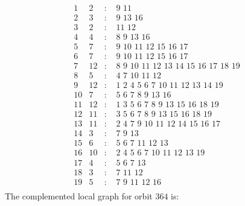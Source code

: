 \documentclass[12pt]{article}
\begin{document}
\begin{equation*}
\begin{array}{rrcl}
1&2&:&\,\,9\,\,11\\
2&3&:&\,\,9\,\,13\,\,16\\
3&2&:&\,\,11\,\,12\\
4&4&:&\,\,8\,\,9\,\,13\,\,16\\
5&7&:&\,\,9\,\,10\,\,11\,\,12\,\,15\,\,16\,\,17\\
6&7&:&\,\,9\,\,10\,\,11\,\,12\,\,15\,\,16\,\,17\\
7&12&:&\,\,8\,\,9\,\,10\,\,11\,\,12\,\,13\,\,14\,\,15\,\,16\,\,17\,\,18\,\,19\\
8&5&:&\,\,4\,\,7\,\,10\,\,11\,\,12\\
9&12&:&\,\,1\,\,2\,\,4\,\,5\,\,6\,\,7\,\,10\,\,11\,\,12\,\,13\,\,14\,\,19\\
10&7&:&\,\,5\,\,6\,\,7\,\,8\,\,9\,\,13\,\,16\\
11&12&:&\,\,1\,\,3\,\,5\,\,6\,\,7\,\,8\,\,9\,\,13\,\,15\,\,16\,\,18\,\,19\\
12&11&:&\,\,3\,\,5\,\,6\,\,7\,\,8\,\,9\,\,13\,\,15\,\,16\,\,18\,\,19\\
13&11&:&\,\,2\,\,4\,\,7\,\,9\,\,10\,\,11\,\,12\,\,14\,\,15\,\,16\,\,17\\
14&3&:&\,\,7\,\,9\,\,13\\
15&6&:&\,\,5\,\,6\,\,7\,\,11\,\,12\,\,13\\
16&10&:&\,\,2\,\,4\,\,5\,\,6\,\,7\,\,10\,\,11\,\,12\,\,13\,\,19\\
17&4&:&\,\,5\,\,6\,\,7\,\,13\\
18&3&:&\,\,7\,\,11\,\,12\\
19&5&:&\,\,7\,\,9\,\,11\,\,12\,\,16\\
\end{array}
\end{equation*}
The complemented local graph for orbit $364$ is:
\end{document}
